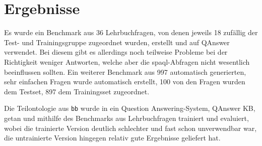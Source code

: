 \chapter{Ergebnisse}\label{ch:results}
Es wurde ein Benchmark aus 36 Lehrbuchfragen, von denen jeweils 18 zufällig der Test- und Trainingsgruppe zugeordnet wurden, erstellt und auf QAnswer verwendet.
Bei diesem gibt es allerdings noch teilweise Probleme bei der Richtigkeit weniger Antworten, welche aber die \ac{spaql}-Abfragen nicht wesentlich beeinflussen sollten.
Ein weiterer Benchmark aus 997 automatisch generierten, sehr einfachen Fragen wurde automatisch erstellt, 100 von den Fragen wurden dem Testset, 897 dem Trainingsset zugeordnet.

Die Teilontologie aus \texttt{bb} wurde in ein Question Answering-System, QAnswer KB, getan und mithilfe des Benchmarks aus Lehrbuchfragen trainiert und evaluiert,
wobei die trainierte Version deutlich schlechter und fast schon unverwendbar war, die untrainierte Version hingegen relativ gute Ergebnisse geliefert hat.
